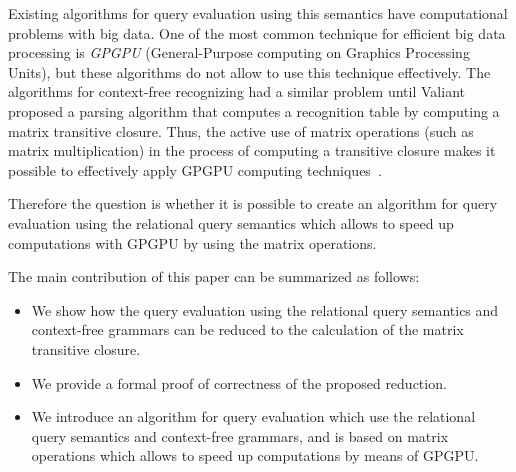 \documentclass{vldb}
\begin{document}
Existing algorithms for query evaluation using this semantics have computational problems with big data. One of the most common technique for efficient big data processing is \textit{GPGPU} (General-Purpose computing on Graphics Processing Units), but these algorithms do not allow to use this technique effectively. The algorithms for context-free recognizing had a similar problem until Valiant~\cite{valiant} proposed a parsing algorithm that computes a recognition table by computing a matrix transitive closure. Thus, the active use of matrix operations (such as matrix multiplication) in the process of computing a transitive closure makes it possible to effectively apply GPGPU computing techniques~\cite{matricesOnGPGPU}.

 Therefore the question is whether it is possible to create an algorithm for query evaluation using the relational query semantics which allows to speed up computations with GPGPU by using the matrix operations.

The main contribution of this paper can be summarized as follows:
\begin{itemize}
    \item We show how the query evaluation using the relational query semantics and context-free grammars can be reduced to the calculation of the matrix transitive closure.
    \item We provide a formal proof of correctness of the proposed reduction.
    \item We introduce an algorithm for query evaluation which use the relational query semantics and context-free grammars, and is based on matrix operations which allows to speed up computations by means of GPGPU.
\end{itemize}











\balancecolumns
\end{document}
